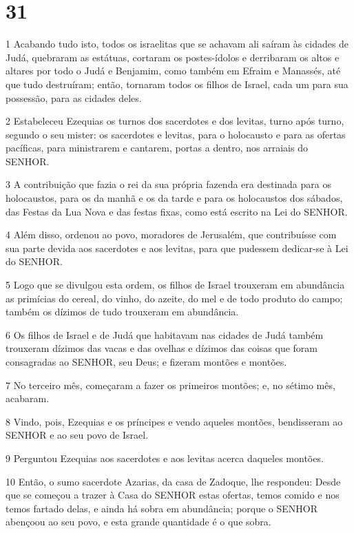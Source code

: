 \chapter{31}

\par 1 Acabando tudo isto, todos os israelitas que se achavam ali saíram às cidades de Judá, quebraram as estátuas, cortaram os postes-ídolos e derribaram os altos e altares por todo o Judá e Benjamim, como também em Efraim e Manassés, até que tudo destruíram; então, tornaram todos os filhos de Israel, cada um para sua possessão, para as cidades deles.
\par 2 Estabeleceu Ezequias os turnos dos sacerdotes e dos levitas, turno após turno, segundo o seu mister: os sacerdotes e levitas, para o holocausto e para as ofertas pacíficas, para ministrarem e cantarem, portas a dentro, nos arraiais do SENHOR.
\par 3 A contribuição que fazia o rei da sua própria fazenda era destinada para os holocaustos, para os da manhã e os da tarde e para os holocaustos dos sábados, das Festas da Lua Nova e das festas fixas, como está escrito na Lei do SENHOR.
\par 4 Além disso, ordenou ao povo, moradores de Jerusalém, que contribuísse com sua parte devida aos sacerdotes e aos levitas, para que pudessem dedicar-se à Lei do SENHOR.
\par 5 Logo que se divulgou esta ordem, os filhos de Israel trouxeram em abundância as primícias do cereal, do vinho, do azeite, do mel e de todo produto do campo; também os dízimos de tudo trouxeram em abundância.
\par 6 Os filhos de Israel e de Judá que habitavam nas cidades de Judá também trouxeram dízimos das vacas e das ovelhas e dízimos das coisas que foram consagradas ao SENHOR, seu Deus; e fizeram montões e montões.
\par 7 No terceiro mês, começaram a fazer os primeiros montões; e, no sétimo mês, acabaram.
\par 8 Vindo, pois, Ezequias e os príncipes e vendo aqueles montões, bendisseram ao SENHOR e ao seu povo de Israel.
\par 9 Perguntou Ezequias aos sacerdotes e aos levitas acerca daqueles montões.
\par 10 Então, o sumo sacerdote Azarias, da casa de Zadoque, lhe respondeu: Desde que se começou a trazer à Casa do SENHOR estas ofertas, temos comido e nos temos fartado delas, e ainda há sobra em abundância; porque o SENHOR abençoou ao seu povo, e esta grande quantidade é o que sobra.
